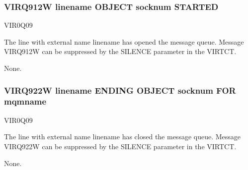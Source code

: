 \documentclass[letterpaper,10pt,english]{sphinxmanual}
\begin{document}
\subsubsection{VIRQ912W linename OBJECT socknum STARTED}
\label{\detokenize{messages:virq912w-linename-object-socknum-started}}\begin{description}
\sphinxAtStartPar
VIR0Q09

\sphinxAtStartPar
The line with external name linename has opened the message queue. Message VIRQ912W can be suppressed by the SILENCE parameter in the VIRTCT.

\sphinxAtStartPar
None.

\end{description}


\subsubsection{VIRQ922W linename ENDING OBJECT socknum FOR mqmname}
\label{\detokenize{messages:virq922w-linename-ending-object-socknum-for-mqmname}}\begin{description}
\sphinxAtStartPar
VIR0Q09

\sphinxAtStartPar
The line with external name linename has closed the message queue. Message VIRQ922W can be suppressed by the SILENCE parameter in the VIRTCT.

\sphinxAtStartPar
None.

\end{description}
\end{document}
